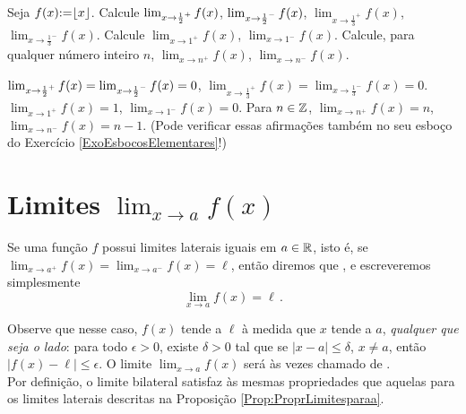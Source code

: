 \begin{exo}
Seja $f(x){:=} \lfloor x\rfloor$.
Calcule 
$\lim_{x\to \frac{1}{2}^+}f(x)$, $\lim_{x\to \frac{1}{2}^-}f(x)$, 
$\lim_{x\to \frac{1}{3}^+}f(x)$, $\lim_{x\to \frac{1}{3}^-}f(x)$. 
Calcule
$\lim_{x\to 1^+}f(x)$, $\lim_{x\to 1^-}f(x)$. Calcule, para qualquer número
inteiro $n$, $\lim_{x\to n^+}f(x)$, $\lim_{x\to n^-}f(x)$.
\begin{sol}
$\lim_{x\to \frac{1}{2}^+}f(x)=\lim_{x\to \frac{1}{2}^-}f(x)=0$, 
$\lim_{x\to \frac{1}{3}^+}f(x)=\lim_{x\to \frac{1}{3}^-}f(x)=0$. 
$\lim_{x\to 1^+}f(x)=1$, $\lim_{x\to 1^-}f(x)=0$. Para 
$n\in \mathbb{Z}$, $\lim_{x\to n^+}f(x)=n$, $\lim_{x\to n^-}f(x)=n-1$.
(Pode verificar essas afirmações também no seu esboço do
Exercício \ref{ExoEsbocosElementares}!)
\end{sol}
\end{exo}

\section{Limites $\lim_{x\to a}f(x)$}

\begin{defin}
Se uma função $f$ possui limites laterais iguais em $a\in \mathbb{R}$, isto é, se $\lim_{x\to
a^+}f(x)=\lim_{x\to a^-}f(x)=\ell$, então 
diremos que , e escreveremos
simplesmente
$$\lim_{x\to a}f(x)=\ell\,.$$
\end{defin}

 Observe que nesse caso, $f(x)$ tende a $\ell$ à medida que $x$ tende a $a$,
\emph{qualquer que seja o lado}: para todo $\epsilon>0$, existe 
$\delta>0$ tal que se
$|x-a|\leq \delta$, $x\neq a$, então $|f(x)-\ell|\leq \epsilon$. O 
limite $\lim_{x\to
a}f(x)$ será às
vezes chamado de .\\

Por definição, o limite bilateral satisfaz às mesmas propriedades que 
aquelas para os
limites laterais descritas na Proposição \ref{Prop:ProprLimitesparaa}.

